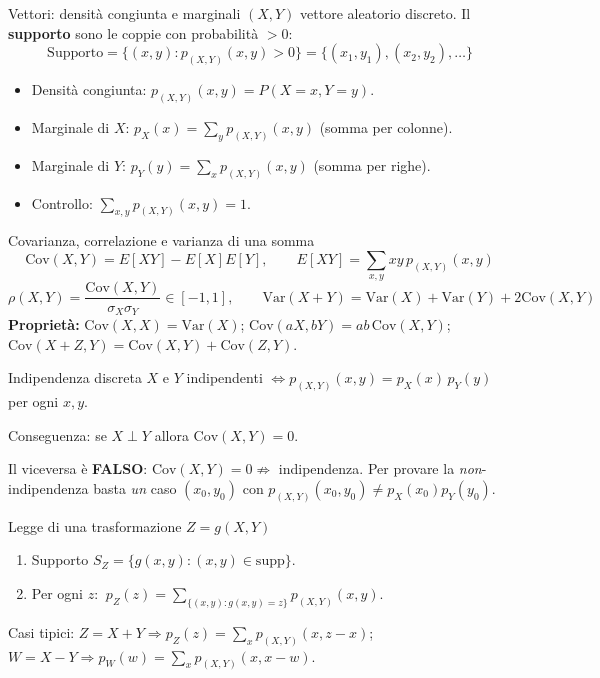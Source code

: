 \documentclass[11pt]{article}
\begin{document}
\begin{concetto}[barBlue]{Vettori: densit\`a congiunta e marginali}
$(X,Y)$ vettore aleatorio discreto. Il \textbf{supporto} sono le coppie con probabilit\`a $>0$:
\[ \text{Supporto} = \{(x,y): p_{(X,Y)}(x,y)>0\} = \{(x_1,y_1),(x_2,y_2),\dots\} \]
\begin{itemize}[leftmargin=1.2em,itemsep=2pt,topsep=2pt]
\item Densit\`a congiunta: $p_{(X,Y)}(x,y) = P(X{=}x, Y{=}y)$.
\item Marginale di $X$: $p_X(x) = \sum_{y} p_{(X,Y)}(x,y)$ (somma per colonne).
\item Marginale di $Y$: $p_Y(y) = \sum_{x} p_{(X,Y)}(x,y)$ (somma per righe).
\item Controllo: $\sum_{x,y} p_{(X,Y)}(x,y) = 1$.
\end{itemize}
\end{concetto}

\begin{concetto}[barBlue]{Covarianza, correlazione e varianza di una somma}
\[ \mathrm{Cov}(X,Y) = E[XY] - E[X]E[Y], \qquad E[XY] = \sum_{x,y} xy\, p_{(X,Y)}(x,y) \]
\[ \rho(X,Y) = \frac{\mathrm{Cov}(X,Y)}{\sigma_X \sigma_Y} \in [-1,1], \qquad \mathrm{Var}(X+Y) = \mathrm{Var}(X)+\mathrm{Var}(Y)+2\mathrm{Cov}(X,Y) \]
\textbf{Propriet\`a:} $\mathrm{Cov}(X,X)=\mathrm{Var}(X)$; \; $\mathrm{Cov}(aX,bY)=ab\,\mathrm{Cov}(X,Y)$; \; $\mathrm{Cov}(X{+}Z,Y)=\mathrm{Cov}(X,Y)+\mathrm{Cov}(Z,Y)$.
\end{concetto}

\begin{concetto}[barBlue]{Indipendenza discreta}
$X$ e $Y$ indipendenti $\iff p_{(X,Y)}(x,y) = p_X(x)\,p_Y(y)$ per ogni $x,y$.

Conseguenza: se $X \perp Y$ allora $\mathrm{Cov}(X,Y)=0$.
\end{concetto}

\begin{attenzione}
Il viceversa \`e \textbf{FALSO}: $\mathrm{Cov}(X,Y)=0 \not\Rightarrow$ indipendenza. Per provare la \emph{non}-indipendenza basta \emph{un} caso $(x_0,y_0)$ con $p_{(X,Y)}(x_0,y_0) \neq p_X(x_0)p_Y(y_0)$.
\end{attenzione}

\begin{concetto}[barBlue]{Legge di una trasformazione $Z=g(X,Y)$}
\begin{enumerate}[leftmargin=1.4em,itemsep=1pt,topsep=2pt]
\item Supporto $S_Z = \{g(x,y):(x,y)\in\text{supp}\}$.
\item Per ogni $z$: $\ p_Z(z) = \sum_{\{(x,y):g(x,y)=z\}} p_{(X,Y)}(x,y)$.
\end{enumerate}
Casi tipici: $Z=X+Y \Rightarrow p_Z(z)=\sum_x p_{(X,Y)}(x,z-x)$; \; $W=X-Y \Rightarrow p_W(w)=\sum_x p_{(X,Y)}(x,x-w)$.
\end{concetto}
\end{document}
